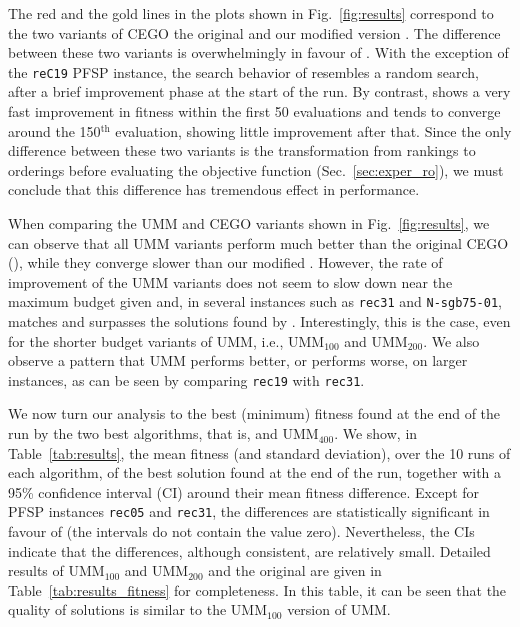\documentclass[sigconf,dvipsnames]{acmart}
\begin{document}
The red and the gold lines in the plots shown in Fig.~\ref{fig:results}
correspond to the two variants of CEGO the original \CEGOorig and our modified
version \CEGOinv. The difference between these two variants is overwhelmingly in
favour of \CEGOinv. With the exception of the \texttt{reC19} PFSP instance, the
search behavior of \CEGOorig resembles a random search, after a brief
improvement phase at the start of the run. By contrast, \CEGOinv shows a very
fast improvement in fitness within the first 50 evaluations and tends to
converge around the 150$^\text{th}$ evaluation, showing little improvement
after that. Since the only difference between these two variants is the
transformation from rankings to orderings before evaluating the objective
function (Sec.~\ref{sec:exper_ro}), we must conclude that this difference has
tremendous effect in performance.

When comparing the UMM and CEGO variants shown in Fig.~\ref{fig:results},
we can observe that all UMM variants perform much better than the
original CEGO (\CEGOorig), while they converge slower than our modified
\CEGOinv. However, the rate of improvement of the UMM variants does not seem to
slow down near the maximum budget given and, in several instances such as
\texttt{rec31} and \texttt{N-sgb75-01}, matches and surpasses the solutions
found by \CEGOinv. Interestingly, this is the case, even for the shorter budget
variants of UMM, i.e., UMM$_{100}$ and UMM$_{200}$. We also observe a
pattern that UMM performs better, or \CEGOinv performs worse, on larger
instances, as can be seen by comparing \texttt{rec19} with \texttt{rec31}.

%
We now turn our analysis to the best (minimum) fitness found at the end of the
run by the two best algorithms, that is, \CEGOinv and UMM$_{400}$. We show, in
Table~\ref{tab:results}, the mean fitness (and standard deviation), over the 10
runs of each algorithm, of the best solution found at the end of the run,
together with a 95\% confidence interval (CI) around their mean fitness
difference.  Except for PFSP instances \texttt{rec05} and \texttt{rec31}, the
differences are statistically significant in favour of \CEGOinv (the intervals
do not contain the value zero). Nevertheless, the CIs indicate that the
differences, although consistent, are relatively small.  Detailed results
of UMM$_{100}$ and UMM$_{200}$ and the original \CEGOorig are given in
Table~\ref{tab:results_fitness} for completeness. In this table, it can be seen that the quality
of \CEGOorig solutions is similar to the UMM$_{100}$ version of UMM.
\end{document}
